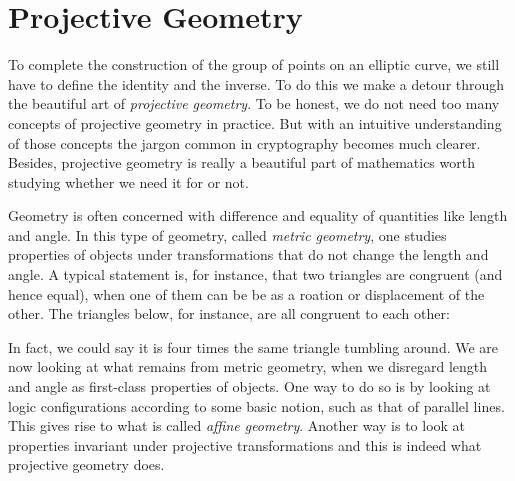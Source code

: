 \documentclass[tikz]{scrreprt}
\newcommand{\Conid}[1]{\mathit{#1}}
\def\resethooks{%
  \global\let\SaveRestoreHook\empty
  \global\let\ColumnHook\empty}
\let\hspre\empty
\let\hspost\empty
\begin{document}
\section{Projective Geometry} 
\ignore{
\begingroup\par\noindent\advance\leftskip\mathindent\(
\begin{pboxed}\SaveRestoreHook
\column{B}{@{}>{\hspre}l<{\hspost}@{}}%
\column{E}{@{}>{\hspre}l<{\hspost}@{}}%
\>[B]{}\mathbf{module}\;\Conid{ECProjective}{}\<[E]%
\\
\>[B]{}\mathbf{where}{}\<[E]%
\ColumnHook
\end{pboxed}
\)\par\noindent\endgroup\resethooks
}

To complete the construction of the group 
of points on an elliptic curve, we still
have to define the identity and the inverse.
To do this we make a detour through the
beautiful art of \emph{projective geometry}.
To be honest, we do not need too many
concepts of projective geometry in practice.
But with an intuitive understanding of those concepts
the jargon common in  cryptography
becomes much clearer. Besides, projective geometry
is really a beautiful part of mathematics
worth studying whether we need it for 
or not.

Geometry is often concerned with difference and
equality of quantities like length and angle.
In this type of geometry, called \emph{metric geometry},
one studies properties of objects under transformations
that do not change the length and angle.
A typical statement is, for instance, that two triangles
are congruent (and hence equal), when one of them
can be be as a roation or displacement of the other.
The triangles below,
for instance, are all congruent to each other:

\begin{center}
\end{center}

In fact, we could say it is four times
the same triangle tumbling around.
We are now looking at what remains 
from metric geometry, when we disregard
length and angle as first-class properties of objects.
One way to do so is by looking at logic configurations
according to some basic notion, such as that of parallel lines.
This gives rise to what is called \emph{affine geometry}.
Another way is to look at properties invariant under 
projective transformations and this is indeed
what projective geometry does.
\end{document}
